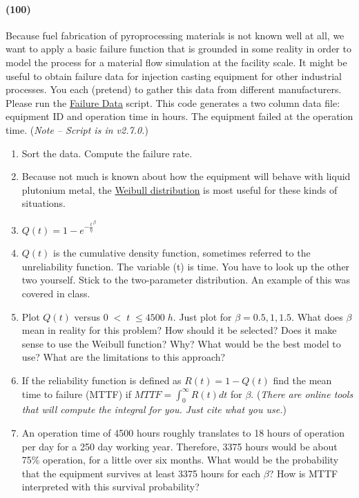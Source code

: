 \documentclass[11pt,a4paper]{article}
\begin{document}
\paragraph*{(100)}
Because fuel fabrication of pyroprocessing materials is not known well at all, we want to apply a basic failure function that is grounded in some reality in order to model the process for a material flow simulation at the facility scale. It might be useful to obtain failure data for injection casting equipment for other industrial processes.  You each (pretend) to gather this data from different manufacturers. Please run the \href{https://github.com/TheDoctorRAB/education/tree/master/src}{Failure Data} script. This code generates a two column data file: equipment ID and operation time in hours. The equipment failed at the operation time. (\textit{Note -- Script is in v2.7.0.})
\begin{enumerate}[topsep=3pt,itemsep=0.50ex,partopsep=1ex,parsep=1ex,label=(\arabic*)]
    \item Sort the data. Compute the failure rate.
    \item Because not much is known about how the equipment will behave with liquid plutonium metal, the \href{https://uidaho.pressbooks.pub/riskassessment/chapter/failure-rates/}{Weibull distribution} is most useful for these kinds of situations.
    \item $Q(t) = 1 - e^{-\frac{t}{\eta}^{\beta}}$
    \item $Q(t)$ is the cumulative density function, sometimes referred to the unreliability function. The variable (t) is time. You have to look up the other two yourself. Stick to the two-parameter distribution. An example of this was covered in class.
    \item Plot $Q(t)$ versus $0 \; < \; t \; \leq 4500 \; h$. Just plot for $\beta = 0.5, 1, 1.5$. What does $\beta$  mean in reality for this problem? How should it be selected? Does it make sense to use the Weibull function? Why? What would be the best model to use? What are the limitations to this approach?
    \item If the reliability function is defined as $R(t) = 1 - Q(t)$ find the mean time to failure (MTTF) if $MTTF=\int_0^{\infty} R(t) dt$ for $\beta$. (\textit{There are online tools that will compute the integral for you. Just cite what you use.})
    \item An operation time of 4500 hours roughly translates to 18 hours of operation per day for a 250 day working year. Therefore, 3375 hours would be about 75\% operation, for a little over six months. What would be the probability that the equipment survives at least 3375 hours for each $\beta$? How is MTTF interpreted with this survival probability?
\end{enumerate}
\end{document}
